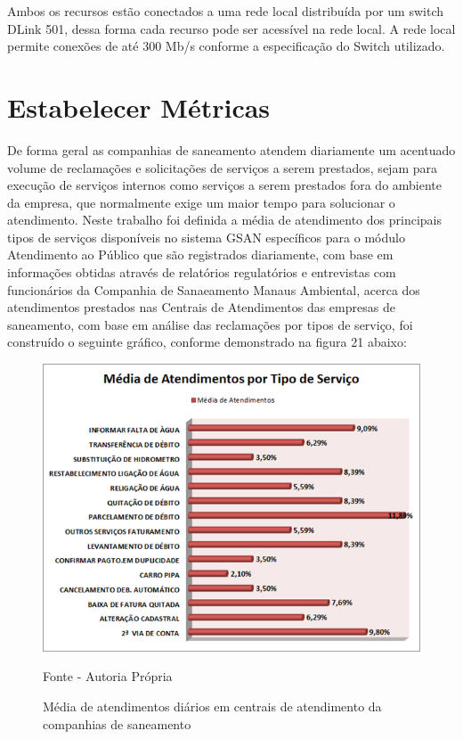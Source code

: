 Ambos os recursos estão conectados a uma rede local distribuída por um switch DLink 501, dessa forma cada recurso pode ser acessível na rede local. A rede local permite conexões de até 300 Mb/s conforme a especificação do Switch utilizado.


\section{Estabelecer Métricas}
De forma geral as companhias de saneamento atendem diariamente um acentuado volume de reclamações e solicitações de serviços a serem prestados, sejam para execução de serviços internos como serviços a serem prestados fora do ambiente da empresa, que normalmente exige um maior tempo para solucionar o atendimento.
Neste trabalho foi definida a média de atendimento dos principais tipos de serviços disponíveis no sistema GSAN específicos para o módulo Atendimento ao Público que são registrados diariamente, com base em informações obtidas através de relatórios regulatórios e entrevistas com funcionários da Companhia de Sanaeamento Manaus Ambiental, acerca dos atendimentos prestados nas Centrais de Atendimentos das empresas de saneamento, com base em análise das reclamações por tipos de serviço, foi construído o seguinte gráfico, conforme demonstrado na figura 21 abaixo:

\begin{figure}[!htb]
	\centering
	\includegraphics{figuras/media_atendimentos.png}
	\caption{Média de atendimentos diários em centrais de atendimento da companhias de saneamento}	
	Fonte - Autoria Própria
\end{figure}


